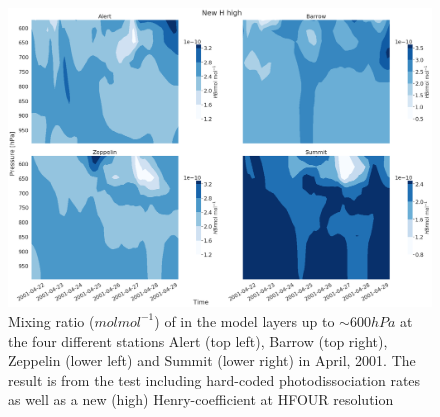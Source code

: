 \begin{figure}[h]
    \centering
    \includegraphics[width=\linewidth]{Chapter6_Results/images/vertHBr_HFOUR_step3.png}
    \caption{Mixing ratio ($mol mol^{-1}$) of  in the model layers up to $\sim 600 hPa$ at the four different stations Alert (top left), Barrow (top right), Zeppelin (lower left) and Summit (lower right) in April, 2001. The result is from the test including hard-coded photodissociation rates as well as a new (high) Henry-coefficient at HFOUR resolution}
    \label{fig:vertHBr_HFOUR_step3}
\end{figure}